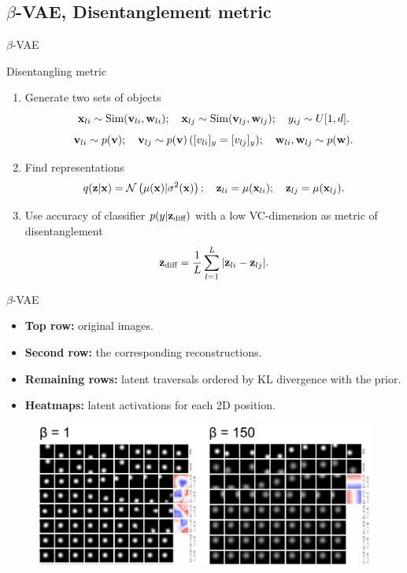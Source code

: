 \subsection{$\beta$-VAE, Disentanglement metric}
\begin{frame}{$\beta$-VAE}
	\begin{block}{Disentangling metric}
		\begin{enumerate}
			\item Generate two sets of objects
			\[
			\mathbf{x}_{li} \sim \text{Sim}(\mathbf{v}_{li}, \mathbf{w}_{li}); \quad \mathbf{x}_{lj} \sim \text{Sim}(\mathbf{v}_{lj}, \mathbf{w}_{lj}); \quad y_{ij} \sim U[1, d].
			\]
			\[
			\mathbf{v}_{li} \sim p(\mathbf{v}); \quad \mathbf{v}_{lj} \sim p(\mathbf{v}) \, ([v_{li}]_y = [v_{lj}]_y); \quad \mathbf{w}_{li}, \mathbf{w}_{lj} \sim p(\mathbf{w}).
			\]
			\item Find representations
			\[
			q(\mathbf{z} | \mathbf{x}) = \mathcal{N}\left(\mu(\mathbf{x}) | \sigma^2(\mathbf{x})\right); \quad \mathbf{z}_{li} = \mu(\mathbf{x}_{li}); \quad \mathbf{z}_{lj} = \mu(\mathbf{x}_{lj}).
			\]
			\item Use accuracy of classifier $p(y | \mathbf{z}_{\text{diff}})$ with a low VC-dimension as metric of disentanglement
			\[
			\mathbf{z}_{\text{diff}} = \frac{1}{L} \sum_{l=1}^L | \mathbf{z}_{li} - \mathbf{z}_{lj} |.
			\]
		\end{enumerate}
	\end{block}

\end{frame}
\begin{frame}{$\beta$-VAE}
	\begin{itemize}
		\item \textbf{Top row:} original images.
		\item \textbf{Second row:} the corresponding reconstructions. 
		\item \textbf{Remaining rows:} latent traversals ordered by KL divergence with the prior. 
		\item \textbf{Heatmaps:} latent activations for each 2D position.
	\end{itemize}
	\begin{figure}
		\centering
		\includegraphics[width=\linewidth]{figs/betaVAE_6.png}
	\end{figure}

\end{frame}
